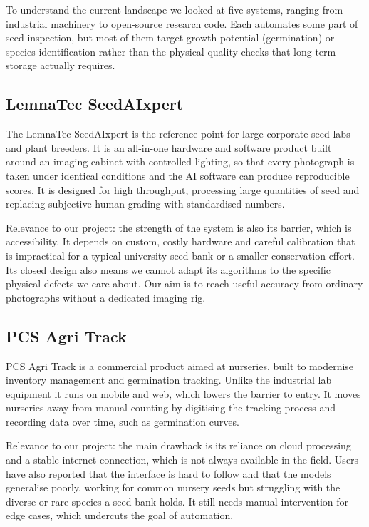 To understand the current landscape we looked at five systems, ranging from
industrial machinery to open-source research code. Each automates some part of
seed inspection, but most of them target growth potential (germination) or
species identification rather than the physical quality checks that long-term
storage actually requires.

\subsection{LemnaTec SeedAIxpert}

The LemnaTec SeedAIxpert \cite{lemnatec2026seedaixpert} is the reference point
for large corporate seed labs and plant breeders. It is an all-in-one hardware
and software product built around an imaging cabinet with controlled lighting,
so that every photograph is taken under identical conditions and the AI software
can produce reproducible scores. It is designed for high throughput, processing
large quantities of seed and replacing subjective human grading with
standardised numbers.

Relevance to our project: the strength of the system is also its barrier, which
is accessibility. It depends on custom, costly hardware and careful calibration
that is impractical for a typical university seed bank or a smaller conservation
effort. Its closed design also means we cannot adapt its algorithms to the
specific physical defects we care about. Our aim is to reach useful accuracy
from ordinary photographs without a dedicated imaging rig.

\subsection{PCS Agri Track}

PCS Agri Track \cite{pcsagri2026track} is a commercial product aimed at
nurseries, built to modernise inventory management and germination tracking.
Unlike the industrial lab equipment it runs on mobile and web, which lowers the
barrier to entry. It moves nurseries away from manual counting by digitising
the tracking process and recording data over time, such as germination curves.

Relevance to our project: the main drawback is its reliance on cloud processing
and a stable internet connection, which is not always available in the field.
Users have also reported that the interface is hard to follow and that the
models generalise poorly, working for common nursery seeds but struggling with
the diverse or rare species a seed bank holds. It still needs manual
intervention for edge cases, which undercuts the goal of automation.

